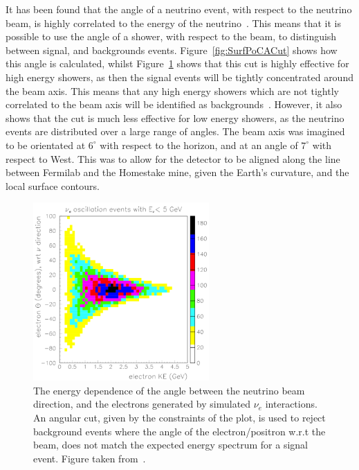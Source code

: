 It has been found that the angle of a neutrino event, with respect to the neutrino beam, is highly correlated to the energy of the neutrino~\citep{barker2012muon}. This means that it is possible to use the angle of a shower, with respect to the beam, to distinguish between signal, and backgrounds events. Figure~\ref{fig:SurfPoCACut} shows how this angle is calculated, whilst Figure~\ref{fig:SurfBeamCut} shows that this cut is highly effective for high energy showers, as then the signal events will be tightly concentrated around the beam axis. This means that any high energy showers which are not tightly correlated to the beam axis will be identified as backgrounds~\citep{LBNE6621}. However, it also shows that the cut is much less effective for low energy showers, as the neutrino events are distributed over a large range of angles. The beam axis was imagined to be orientated at $6^\circ$ with respect to the horizon, and at an angle of $7^\circ$ with respect to West. This was to allow for the detector to be aligned along the line between Fermilab and the Homestake mine, given the Earth's curvature, and the local surface contours. \\

\begin{figure}
  \centering
  \includegraphics[width=0.6\textwidth]{SurfBeamCut}
  \caption[The energy dependence of the angle between the neutrino beam direction, and the electrons generated by simulated $\nu_{e}$ interactions]
          {The energy dependence of the angle between the neutrino beam direction, and the electrons generated by simulated $\nu_{e}$ interactions. An angular cut, given by the constraints of the plot, is used to reject background events where the angle of the electron/positron w.r.t the beam, does not match the expected energy spectrum for a signal event. Figure taken from~\citep{barker2012muon}.}
  \label{fig:SurfBeamCut}
\end{figure}

